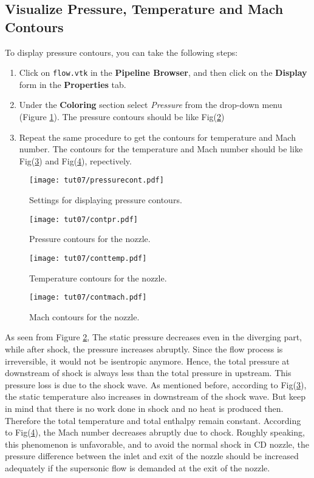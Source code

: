 \subsection{Visualize Pressure, Temperature and Mach Contours}
To display pressure contours, you can take the following steps:
\begin{enumerate}[label=\arabic*)]
	\item Click on \texttt{flow.vtk} in the \textbf{Pipeline Browser}, and then click on the \textbf{Display} form in the \textbf{Properties} tab.
	\item Under the \textbf{Coloring} section select \textit{Pressure} from the drop-down menu (Figure \ref{fig7:pressure contours setting}). The pressure contours should be like Fig(\ref{fig7:plot pressure cont1})
	\item Repeat the same procedure to get the contours for temperature and Mach number. The contours for the temperature and Mach number should be like Fig(\ref{fig7:plot temp cont1}) and Fig(\ref{fig7:plot mach cont1}), repectively.
\end{enumerate}
\begin{figure}[H]
	\centering
	\texttt{[image: tut07/pressurecont.pdf]}
	\caption{Settings for displaying pressure contours.}
	\label{fig7:pressure contours setting}
\end{figure} 
\begin{figure}[ht]
	\centering
	\texttt{[image: tut07/contpr.pdf]}
	\caption{Pressure contours for the nozzle.}
	\label{fig7:plot pressure cont1}
\end{figure}
\begin{figure}[ht]
	\centering
	\texttt{[image: tut07/conttemp.pdf]}
	\caption{Temperature contours for the nozzle.}
	\label{fig7:plot temp cont1}
\end{figure}
\begin{figure}[H]
	\centering
	\texttt{[image: tut07/contmach.pdf]}
	\caption{Mach contours for the nozzle.}
	\label{fig7:plot mach cont1}
\end{figure}

As seen from Figure \ref{fig7:plot pressure cont1}, The static pressure decreases even in the diverging part, while after shock, the pressure increases abruptly. Since the flow process is irreversible, it would not be isentropic anymore. Hence, the total pressure at downstream of shock is always less than the total pressure in upstream. This pressure loss is due to the shock wave. As mentioned before, according to Fig(\ref{fig7:plot temp cont1}), the static temperature also increases in downstream of the shock wave. But keep in mind that there is no work done in shock and no heat is produced then. Therefore the total temperature and total enthalpy remain constant. According to Fig(\ref{fig7:plot mach cont1}), the Mach number decreases abruptly due to chock. Roughly speaking, this phenomenon is unfavorable, and to avoid the normal shock in CD nozzle, the pressure difference between the inlet and exit of the nozzle should be increased adequately if the supersonic flow is demanded at the exit of the nozzle.
